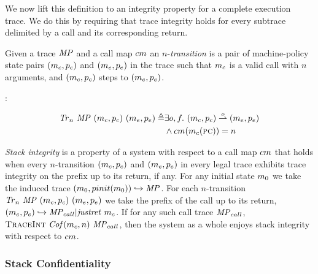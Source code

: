 \documentclass[acmsmall,review,anonymous]{acmart}\settopmatter{printfolios=true,printccs=false,printacmref=false}
\begin{document}
We now lift this definition to an integrity property for a complete
execution trace. We do this by requiring that trace integrity holds
for every subtrace delimited by a call and its corresponding return.

 Given a trace \(\mathit{MP}\) and a call map \(cm\)
an \(n\)-{\em transition} is a pair of
machine-policy state pairs \((m_c,p_c)\) and
\((m_e,p_e)\) in the trace such that
\(m_c\) is a valid call with \(n\) arguments, and
\((m_c,p_c)\) steps to \((m_e,p_e)\).

:

  \[\begin{split}
    \mathit{Tr}_n ~ \mathit{MP} ~ (m_c,p_c) ~ (m_e,p_e)
    \triangleq & \exists o, f.
    ~ (m_c,p_c) \overset{o}{\rightharpoonup} (m_e,p_e) \\
    & \land cm(m_c(\textsc{pc})) = n
  \end{split}\]


{\em Stack integrity} is a property of a system with respect to a call map
\(cm\) that holds when every \(n\)-transition \((m_c,p_c)\)
and \((m_e,p_e)\) in every legal trace exhibits trace integrity
on the prefix up to its return, if any. For any initial state \(m_0\)
we take the induced trace \((m_0,pinit(m_0)) \hookrightarrow
\mathit{MP}\). For each \(n\)-transition \(\mathit{Tr}_n ~ \mathit{MP} ~
(m_c,p_c) ~ (m_e,p_e)\) we take the prefix of
the call up to its return, \((m_e,p_e) \hookrightarrow
\mathit{MP}_{call} | \mathit{justret}\ m_c\). If for any such call trace \(\mathit{MP}_{call}\),
\(\text{\sc TraceInt} ~ \mathit{Cof}(m_c,n) ~ \mathit{MP}_{call}\), then the
system as a whole enjoys stack integrity with respect to \(cm\).


\subsubsection{Stack Confidentiality}
\end{document}
